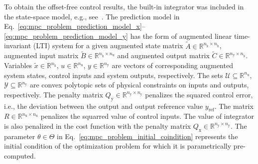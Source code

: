 \documentclass[preprint,12pt]{elsarticle}
\begin{document}
	To obtain the offset-free control results, the built-in integrator was included in the state-space model, e.g., see~\cite{Ruscio_MPC_integral}. 
	The prediction model in Eq.~\eqref{eq:mpc_problem_prediction_model_x}--\eqref{eq:mpc_problem_prediction_model_y} has the form of augmented linear time-invariant (LTI) system for a given augmented state matrix $\widetilde{A} \in \mathbb{R}^{n_{\widetilde{\mathrm{x}}} \times n_{\widetilde{\mathrm{x}}}}$, augmented input matrix $\widetilde{B} \in \mathbb{R}^{n_{\widetilde{\mathrm{x}}} \times n_{\mathrm{u}}}$ and augmented output matrix $\widetilde{C} \in \mathbb{R}^{n_{\mathrm{y}} \times n_{\widetilde{\mathrm{x}}}}$. 
	Variables $\widetilde{x} \in \mathbb{R}^{n_{\widetilde{\mathrm{x}}}}$, $u \in \mathbb{R}^{n_{\mathrm{u}}}$, $y \in \mathbb{R}^{n_{\mathrm{y}}}$ are vectors of corresponding augmented system states, control inputs and system outputs, respectively. 
	The sets $\mathcal{U} \subseteq \mathbb{R}^{n_{\mathrm{u}}}$, $\mathcal{Y} \subseteq \mathbb{R}^{n_{\mathrm{y}}}$ are convex polytopic sets of physical constraints on inputs and outputs, respectively. The penalty matrix $Q_\mathrm{y} \in \mathbb{R}^{n_{\mathrm{y}} \times n_{\mathrm{y}}}$ penalizes the squared control error, i.e., the deviation between the output and output reference value $y_\mathrm{ref}$. The matrix $R \in \mathbb{R}^{n_{\mathrm{u}} \times n_{\mathrm{u}}}$ penalizes the squarred value of control inputs. 
	The value of integrator is also penalized in the cost function with the penalty matrix $Q_\mathrm{x} \in \mathbb{R}^{n_{\mathrm{y}} \times n_{\mathrm{y}}}$. 
	The parameter $\theta \in \Theta$ in Eq.~\eqref{eq:mpc_problem_initial_coindition} represents the initial condition of the optimization problem for which it is parametrically pre-computed. 
	
\end{document}
